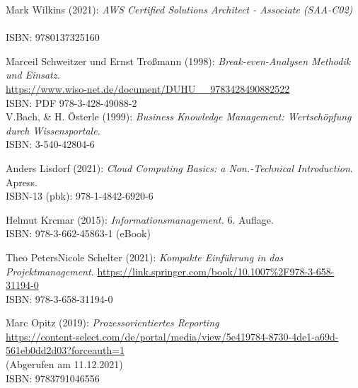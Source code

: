 \begin{thebibliography}{SW11} %
   Mark Wilkins (2021): \textit{AWS Certified Solutions Architect - Associate (SAA-C02)}\\
  \\ISBN: 9780137325160
  
   Marceil Schweitzer und Ernst Troßmann (1998): \textit{Break-even-Analysen Methodik und Einsatz.}\\
  \url{https://www.wiso-net.de/document/DUHU__9783428490882522}\\  
  ISBN: PDF 978-3-428-49088-2\\
  
   V.Bach, \& H. Österle (1999): \textit{Business Knowledge Management: Wertschöpfung durch Wissensportale.}\\
  ISBN: 3-540-42804-6
 
   Anders Lisdorf (2021): \textit{Cloud Computing Basics: a Non.-Technical Introduction}. Apress.\\ 
  ISBN-13 (pbk): 978-1-4842-6920-6 
  
 Helmut Krcmar (2015): \textit{Informationsmanagement.} 6. Auflage.\\ 
  ISBN: 978-3-662-45863-1 (eBook)
  
   Theo PetersNicole Schelter (2021): \textit{Kompakte Einführung in das Projektmanagement.} 
  \url{https://link.springer.com/book/10.1007%2F978-3-658-31194-0}
  \\ISBN: 978-3-658-31194-0

   Marc Opitz (2019): \textit{Prozessorientiertes Reporting} \\
  \url{https://content-select.com/de/portal/media/view/5e419784-8730-4de1-a69d-561eb0dd2d03?forceauth=1}\\
  (Abgerufen am 11.12.2021)\\
  ISBN: 9783791046556
\end{thebibliography}

